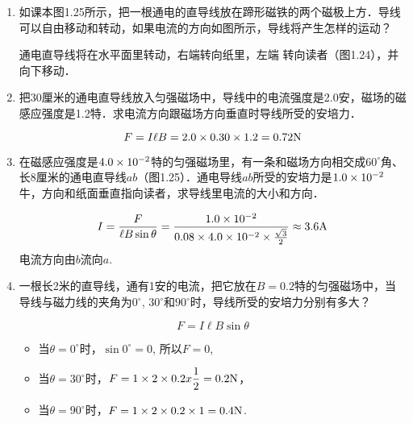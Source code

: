 \begin{enumerate}
    \item 如课本图1.25所示，把一根通电的直导线放在蹄形磁铁的两个磁极上方．导线可以自由移动和转动，如果电流的方向如图所示，导线将产生怎样的运动？

    \begin{solution}
        通电直导线将在水平面里转动，右端转向纸里，左端
        转向读者（图1.24），并向下移动．
    \end{solution}
    
    \item 把30厘米的通电直导线放入匀强磁场中，导线中的电流强度是2.0安，磁场的磁感应强度是1.2特．求电流方向跟磁场方向垂直时导线所受的安培力．

    \begin{solution}
\[F=I\ell B=2.0\times 0.30\times 1.2=0.72{\rm N}\]
    \end{solution}
    


    \item 在磁感应强度是$4.0\times10^{-2}$特的匀强磁场里，有一条和磁场方向相交成$60^\circ$角、长8厘米的通电直导线$ab$（图1.25）．通电导线$ab$所受的安培力是$1.0\times10^{-2}$牛，方向和纸面垂直指向读者，求导线里电流的大小和方向．

    \begin{figure}[htp]
        \centering
        \caption{}
    \end{figure}
    


    \begin{solution}
    \[I=\frac{F}{\ell B\sin\theta}=\frac{1.0\times 10^{-2}}{0.08\times 4.0\times 10^{-2}\times \frac{\sqrt{3}}{2}}\approx 3.6{\rm A}\]
    电流方向由$b$流向$a$. 
    \end{solution}
    
    \item 一根长2米的直导线，通有1安的电流，把它放在$B=0.2$特的匀强磁场中，当导线与磁力线的夹角为$0^\circ$, $30^\circ$和$90^\circ$时，导线所受的安培力分别有多大？

    \begin{solution}
\[F=I\ell B\sin\theta\]
\begin{itemize}
    \item 当$\theta=0^{\circ}$时，$\sin0^{\circ}=0$, 所以$F=0$,
    \item 当$\theta=30^{\circ}$时，$F=1\times2\times0.2x\dfrac{1}{2}=0.2{\rm N}$，
    \item 当$\theta=90^{\circ}$时，$F=1\times2\times0.2\times1=0.4{\rm N}$.
\end{itemize}
    \end{solution}
    

\end{enumerate}
